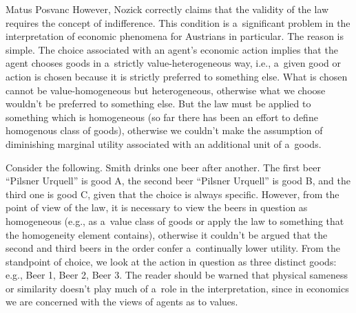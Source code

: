 \begin{artengenv}{Matus Posvanc}
However, Nozick 
\parencite*[][]{Nozick1977On} %
 correctly claims that the validity of the law requires the concept of indifference. This condition is a~significant problem in the interpretation of economic phenomena for Austrians in particular. The reason is simple. The choice associated with an agent's economic action implies that the agent chooses goods in a~strictly value-heterogeneous way, i.e., a~given good or action is chosen because it is strictly preferred to something else. What is chosen cannot be value-homogeneous but heterogeneous, otherwise what we choose wouldn't be preferred to something else. But the law must be applied to something which is homogeneous (so far there has been an effort to define homogenous class of goods), otherwise we couldn't make the assumption of diminishing marginal utility associated with an additional unit of a~goods.



Consider the following. Smith drinks one beer after another. The first beer ``Pilsner Urquell'' is good A, the second beer ``Pilsner Urquell'' is good B, and the third one is good C, given that the choice is always specific. However, from the point of view of the law, it is necessary to view the beers in question as homogeneous (e.g., as a~value class of goods or apply the law to something that the homogeneity element contains), otherwise it couldn't be argued that the second and third beers in the order confer a~continually lower utility. From the standpoint of choice, we look at the action in question as three distinct goods: e.g., Beer 1, Beer 2, Beer 3. The reader should be warned that physical sameness or similarity doesn't play much of a~role in the interpretation, since in economics we are concerned with the views of agents as to values.




\end{artengenv}
